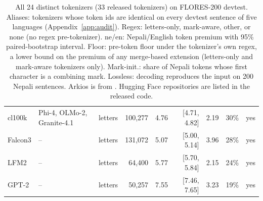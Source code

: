 \begin{table}[t]
\begin{tabular}{lllrrrrrl}
cl100k & Phi-4, OLMo-2, Granite-4.1 & letters & 100,277 & 4.76 & [4.71, 4.82] & 2.19 & 30\% & yes \\
Falcon3 & -- & letters & 131,072 & 5.07 & [5.00, 5.14] & 3.96 & 28\% & yes \\
LFM2 & -- & letters & 64,400 & 5.77 & [5.70, 5.84] & 2.15 & 24\% & yes \\
GPT-2 & -- & letters & 50,257 & 7.55 & [7.46, 7.65] & 3.23 & 19\% & yes \\
\bottomrule
\end{tabular}
\caption{All 24 distinct tokenizers (33 released tokenizers) on FLORES-200 devtest. Aliases: tokenizers whose token ids are identical on every devtest sentence of five languages (Appendix~\ref{app:audit}). Regex: letters-only, mark-aware, other, or none (no regex pre-tokenizer). ne/en: Nepali/English token premium with 95\% paired-bootstrap interval. Floor: pre-token floor under the tokenizer's own regex, a lower bound on the premium of any merge-based extension (letters-only and mark-aware tokenizers only). Mark-init.: share of Nepali tokens whose first character is a combining mark. Lossless: decoding reproduces the input on 200 Nepali sentences. Arkios is from \citet{regmi2026arkios}. Hugging Face repositories are listed in the released code.}
\label{tab:audit-full}
\end{table}
